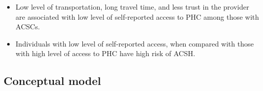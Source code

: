 \begin{itemize}
  \item Low level of transportation, long travel time, and less trust in the provider are associated with low level of self-reported access to PHC among those with ACSCs.
  \item Individuals with low level of self-reported access, when compared with those with high level of access to PHC have high risk of ACSH.
\end{itemize}





\subsection{Conceptual model}

